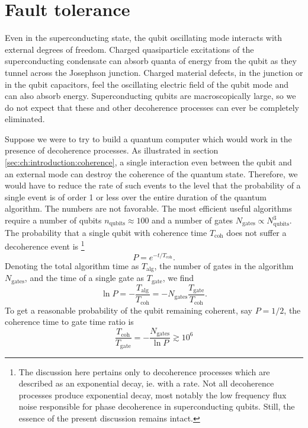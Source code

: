 \section{Fault tolerance}

Even in the superconducting state, the qubit oscillating mode interacts with external degrees of freedom.
Charged quasiparticle excitations of the superconducting condensate can absorb quanta of energy from the qubit as they tunnel across the Josephson junction.
Charged material defects, in the junction or in the qubit capacitors, feel the oscillating electric field of the qubit mode and can also absorb energy.
Superconducting qubits are macroscopically large, so we do not expect that these and other decoherence processes can ever be completely eliminated.

Suppose we were to try to build a quantum computer which would work in the presence of decoherence processes.
As illustrated in section \ref{sec:ch:introduction:coherence}, a single interaction even between the qubit and an external mode can destroy the coherence of the quantum state.
Therefore, we would have to reduce the rate of such events to the level that the probability of a single event is of order 1 or less over the entire duration of the quantum algorithm.
The numbers are not favorable.
The most efficient useful algorithms require a number of qubits $n_{\text{qubits}}\approx 100$ and a number of gates $N_{\text{gates}}\propto N_{\text{qubits}}^3$.
The probability that a single qubit with coherence time $T_{\text{coh}}$ does not suffer a decoherence event is \footnote{The discussion here pertains only to decoherence processes which are described as an exponential decay, ie. with a rate. Not all decoherence processes produce exponential decay, most notably the low frequency flux noise responsible for phase decoherence in superconducting qubits. Still, the essence of the present discussion remains intact.}
 \begin{equation}
P = e^{-t/T_{\text{coh}}} .\end{equation}
Denoting the total algorithm time as $T_{\text{alg}}$, the number of gates in the algorithm $N_{\text{gates}}$, and the time of a single gate as $T_{\text{gate}}$, we find \begin{equation}
\ln P = -\frac{T_{\text{alg}}}{T_{\text{coh}}} = -N_{\text{gates}} \frac{T_{\text{gate}}}{T_{\text{coh}}} . \end{equation}
To get a reasonable probability of the qubit remaining coherent, say $P=1/2$, the coherence time to gate time ratio is \begin{equation}
\frac{T_{\text{coh}}}{T_{\text{gate}}} = -\frac{N_{\text{gates}}}{\ln P} \gtrsim 10^6 \end{equation}
